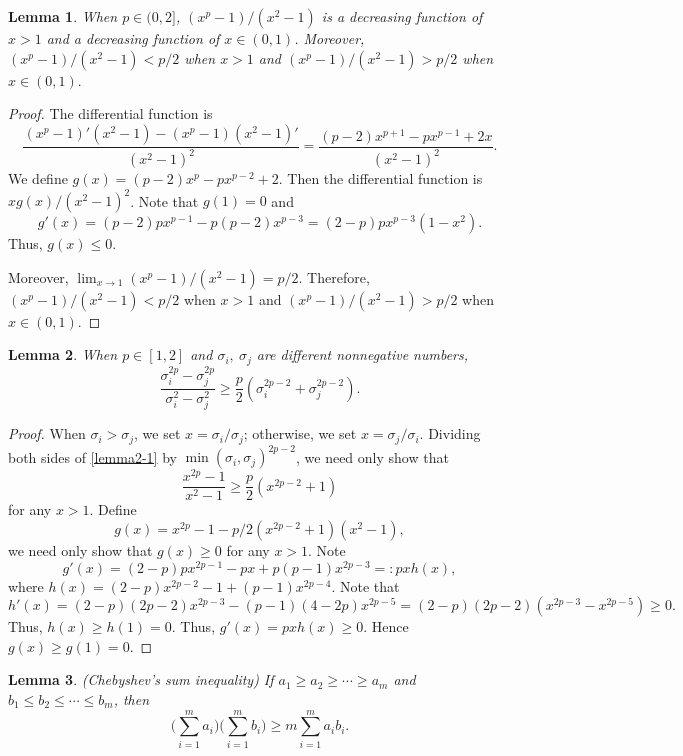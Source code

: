 \documentclass[11pt, a4paper]{article}
\newtheorem{lemma}{Lemma}
\theoremstyle{remark}
\begin{document}
\begin{lemma} \label{nns-dec}
When $p\in(0,2]$,
$(x^p-1)/(x^2-1)$ is a decreasing function of $x>1$ and a decreasing function of $x\in(0,1)$. Moreover, $(x^p-1)/(x^2-1)<p/2$ when $x>1$ and $(x^p-1)/(x^2-1)>p/2$ when $x\in(0,1).$
\end{lemma}
\begin{proof}
    The differential function is 
    $$\frac{(x^p-1)'(x^2-1)-(x^p-1)(x^2-1)'}{(x^2-1)^2}=\frac{(p-2)x^{p+1}-px^{p-1}+2x}{(x^2-1)^2}.$$
    We define $g(x)=(p-2)x^p-px^{p-2}+2$. Then the  differential function is $xg(x)/(x^2-1)^2$. Note that $g(1)=0$ and $$g'(x)=(p-2)px^{p-1}-p(p-2)x^{p-3}=(2-p)px^{p-3}(1-x^2).$$ Thus, $g(x)\le0$.

    Moreover, $\lim_{x\to1}(x^p-1)/(x^2-1)=p/2$. Therefore, $(x^p-1)/(x^2-1)<p/2$ when $x>1$ and $(x^p-1)/(x^2-1)>p/2$ when $x\in(0,1).$
\end{proof}

\begin{lemma} \label{bernoulli}
When $p\in[1,2]$ and $\sigma_i,\ \sigma_j$ are different nonnegative numbers,
\begin{equation}
        \frac{\sigma_i^{2p}-\sigma_j^{2p}}{\sigma_i^{2}-\sigma_j^2}\ge \frac{p}{2}(\sigma_i^{2p-2}+\sigma_j^{2p-2}). \label{lemma2-1}
    \end{equation}
\end{lemma}
\begin{proof}
    When $ \sigma_i > \sigma_j $, we set $ x = \sigma_i/\sigma_j $; otherwise, we set $ x = \sigma_j/\sigma_i $. Dividing both sides of \eqref{lemma2-1} by 
$\min(\sigma_i, \sigma_j)^{2p-2}$, we need only show that $$\frac{x^{2p}-1}{x^2-1}\ge \frac{p}{2}(x^{2p-2}+1)$$ for any $x> 1$. Define $$g(x)=x^{2p}-1- p/2(x^{2p-2}+1)(x^2-1),$$ we need only show that $g(x)\ge0$ for any $x> 1$. Note $$g'(x)=(2-p)px^{2p-1}-px+p(p-1)x^{2p-3}=:pxh(x),$$ where $h(x)=(2-p)x^{2p-2}-1+(p-1)x^{2p-4}$. Note that $$h'(x)=(2-p)(2p-2)x^{2p-3}-(p-1)(4-2p)x^{2p-5}=(2-p)(2p-2)(x^{2p-3}-x^{2p-5})\ge0.$$ Thus, $h(x)\ge h(1)=0$. Thus, $g'(x)=pxh(x)\ge0$. Hence $g(x)\ge g(1)=0.$
\end{proof}

\begin{lemma} \label{chebyshev}
(Chebyshev's sum inequality)
If $a_1\ge a_2\ge\cdots\ge a_m$ and $b_1\le b_2\le\cdots\le b_m$, then $$\Big(\sum_{i=1}^m a_i\Big)\Big(\sum_{i=1}^m b_i\Big)\ge m\sum_{i=1}^m a_ib_i.$$
\end{lemma}
\end{document}
